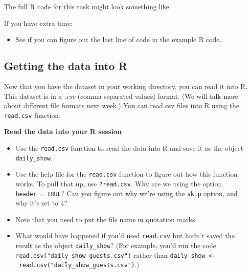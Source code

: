 \documentclass[]{book}
\makeatletter
\newenvironment{Shaded}{\begin{snugshade}}{\end{snugshade}}
\newcommand{\KeywordTok}[1]{\textcolor[rgb]{0.13,0.29,0.53}{\textbf{{#1}}}}
\newcommand{\StringTok}[1]{\textcolor[rgb]{0.31,0.60,0.02}{{#1}}}
\newcommand{\NormalTok}[1]{{#1}}
\providecommand{\tightlist}{%
  \setlength{\itemsep}{0pt}\setlength{\parskip}{0pt}}
\newenvironment{kframe}{%
\medskip{}
\setlength{\fboxsep}{.8em}
 \def\at@end@of@kframe{}%
 \ifinner\ifhmode%
  \def\at@end@of@kframe{\end{minipage}}%
  \begin{minipage}{\columnwidth}%
 \fi\fi%
 \def\FrameCommand##1{\hskip\@totalleftmargin \hskip-\fboxsep
 \colorbox{shadecolor}{##1}\hskip-\fboxsep
     \hskip-\linewidth \hskip-\@totalleftmargin \hskip\columnwidth}%
 \MakeFramed {\advance\hsize-\width
   \@totalleftmargin\z@ \linewidth\hsize
   \@setminipage}}%
 {\par\unskip\endMakeFramed%
 \at@end@of@kframe}
\renewenvironment{Shaded}{\begin{kframe}}{\end{kframe}}
\makeatother
\begin{document}
The full R code for this task might look something like:

\begin{Shaded}
\end{Shaded}

If you have extra time:

\begin{itemize}
\tightlist
\item
  See if you can figure out the last line of code in the example R code.
\end{itemize}

\subsection{Getting the data into R}\label{getting-the-data-into-r}

Now that you have the dataset in your working directory, you can read it
into R. This dataset is in a \emph{.csv} (comma separated values)
format. (We will talk more about different file formats next week.) You
can read csv files into R using the \texttt{read.csv} function.

\textbf{Read the data into your R session}

\begin{itemize}
\tightlist
\item
  Use the \texttt{read.csv} function to read the data into R and save it
  as the object \texttt{daily\_show}.
\item
  Use the help file for the \texttt{read.csv} function to figure out how
  this function works. To pull that up, use \texttt{?read.csv}. Why are
  we using the option \texttt{header\ =\ TRUE}? Can you figure out why
  we're using the \texttt{skip} option, and why it's set to 4?
\item
  Note that you need to put the file name in quotation marks.
\item
  What would have happened if you'd used \texttt{read.csv} but hadn't
  saved the result as the object \texttt{daily\_show}? (For example,
  you'd run the code \texttt{read.csv("daily\_show\_guests.csv")} rather
  than
  \texttt{daily\_show\ \textless{}-\ read.csv("daily\_show\_guests.csv")}.)
\end{itemize}
\end{document}
